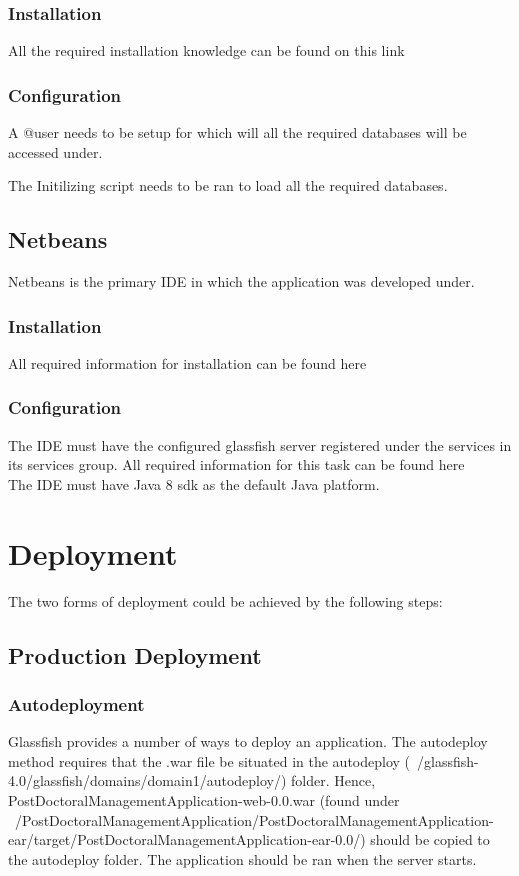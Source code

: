 \documentclass[12pt]{article}
\begin{document}
\subsubsection{Installation}
All the required installation knowledge can be found on this link %

\subsubsection{Configuration}
A @user needs to be setup for which will all the required databases will be accessed under. 

The Initilizing script needs to be ran to load all the required databases.

\subsection{Netbeans} 
Netbeans is the primary IDE in which the application was developed under.

\subsubsection{Installation}
All required information for installation can be found here %

\subsubsection{Configuration}
The IDE must have the configured glassfish server registered under the services in its services group. All required information for this task can be found here %
\\
The IDE must have Java 8 sdk as the default Java platform.

\section{Deployment}
The two forms of deployment could be achieved by the following steps: 
\subsection{Production Deployment}

\subsubsection{Autodeployment}
Glassfish provides a number of ways to deploy an application. The autodeploy method requires that the .war file be situated in the autodeploy (~/glassfish-4.0/glassfish/domains/domain1/autodeploy/) folder. Hence, PostDoctoralManagementApplication-web-0.0.war (found under ~/PostDoctoralManagementApplication/PostDoctoralManagementApplication-ear/target/PostDoctoralManagementApplication-ear-0.0/) should be copied to the autodeploy folder. The application should be ran when the server starts.
\end{document}
